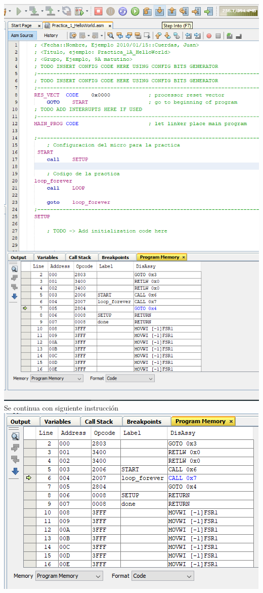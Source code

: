 \documentclass{article}
\begin{document}
\includegraphics[width=\textwidth]{debug1}\\
Se continua con siguiente instrucción\\
\includegraphics[width=\textwidth]{debug2}\\
\end{document}
